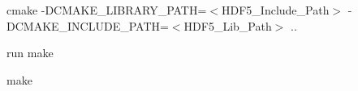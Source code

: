 \begin{DoxyEnumerate}
\begin{DoxyItemize}
\begin{DoxyItemize}
\begin{DoxyItemize}
\item cmake -\/\+D\+C\+M\+A\+K\+E\+\_\+\+L\+I\+B\+R\+A\+R\+Y\+\_\+\+P\+A\+TH=$<$\+H\+D\+F5\+\_\+\+Include\+\_\+\+Path$>$ -\/\+D\+C\+M\+A\+K\+E\+\_\+\+I\+N\+C\+L\+U\+D\+E\+\_\+\+P\+A\+TH=$<$\+H\+D\+F5\+\_\+\+Lib\+\_\+\+Path$>$ ..
\end{DoxyItemize}
\end{DoxyItemize}
\item run make
\begin{DoxyItemize}
\item make 
\end{DoxyItemize}
\end{DoxyItemize}
\end{DoxyEnumerate}